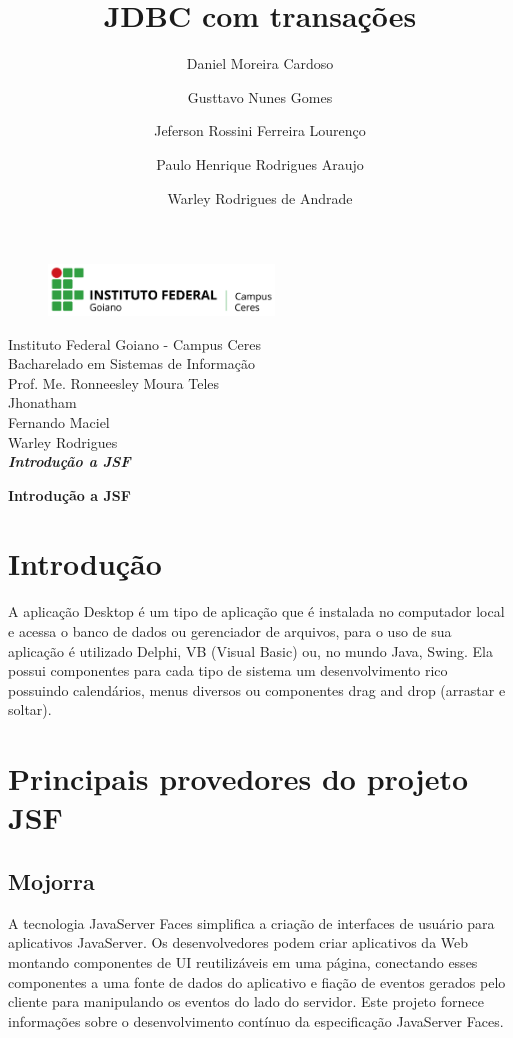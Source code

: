 \documentclass[12pt,a4paper]{article}
\title{JDBC com transações}
\author{Daniel Moreira Cardoso \and Gusttavo Nunes Gomes\and Jeferson Rossini Ferreira Lourenço\and Paulo Henrique Rodrigues Araujo\and Warley Rodrigues de Andrade}
\begin{document}
\begin{titlepage}
\begin{center}
\begin{figure}[htb]
                
                \label{figura:LogoIF}
        
                \centering
                \includegraphics[width=6cm]{recursos/imagens/logo.png} 
\end{figure}
Instituto Federal Goiano - Campus Ceres\\
Bacharelado em Sistemas de Informação\\
Prof. Me. Ronneesley Moura Teles\\\vspace{0.5cm}
Jhonatham\\
Fernando Maciel\\
Warley Rodrigues\\
\vspace{5.0cm}
\textit{\textbf{\Large{Introdução a JSF}}}\\\vspace{0.5cm}
\vspace{9.5cm}
\end{center}
\end{titlepage}
\tableofcontents
\newpage
\begin{center}
\textbf{\Large{Introdução a JSF}}\\\vspace{0.5cm}
\end{center}
\section{Introdução}
A aplicação Desktop é um tipo de aplicação que é instalada no computador local e acessa o banco de dados ou gerenciador de arquivos, para o uso de sua aplicação é utilizado Delphi, VB (Visual Basic) ou, no mundo Java, Swing. Ela possui componentes para cada tipo de sistema um desenvolvimento rico possuindo calendários, menus diversos ou componentes drag and drop (arrastar e soltar).

\section{Principais provedores do projeto JSF}
\subsection{Mojorra}
A tecnologia JavaServer Faces simplifica a criação de interfaces de usuário para aplicativos JavaServer. Os desenvolvedores podem criar aplicativos da Web montando componentes de UI reutilizáveis em uma página, conectando esses componentes a uma fonte de dados do aplicativo e fiação de eventos gerados pelo cliente para manipulando os eventos do lado do servidor. Este projeto fornece informações sobre o desenvolvimento contínuo da especificação JavaServer Faces.
\end{document}
